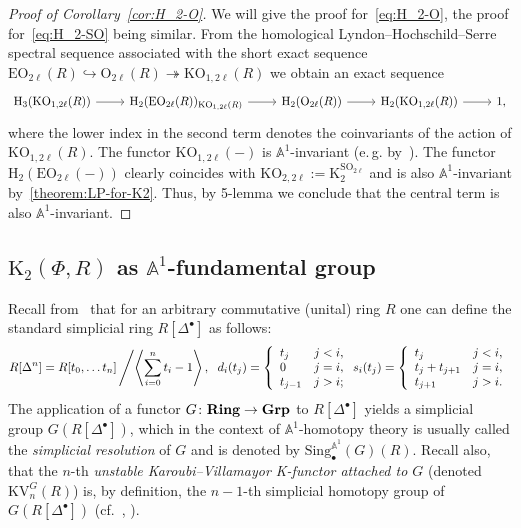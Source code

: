 \documentclass[oneside, 11pt]{amsart}
\numberwithin{equation}{section}
\newcommand{\K}{{\mathrm{K}}}
\theoremstyle{definition}
\theoremstyle{definition}
\theoremstyle{remark}
\newcommand{\catname}[1]{{\normalfont\textbf{#1}}} %
\begin{document}
 \begin{proof}[Proof of Corollary~\ref{cor:H_2-O}]
  We will give the proof for~\eqref{eq:H_2-O}, the proof for~\eqref{eq:H_2-SO} being similar.
  From the homological Lyndon--Hochschild--Serre spectral sequence associated with the short exact sequence $\mathrm{EO}_{2\ell}(R) \hookrightarrow \mathrm{O}_{2\ell}(R) \twoheadrightarrow \mathrm{KO}_{1, 2\ell}(R)$ we obtain an exact sequence
  \[ \begin{tikzcd} \mathrm H_3(\mathrm{KO}_{1,2\ell}(R)) \ar[r] & \mathrm H_2(\mathrm{EO}_{2\ell}(R))_{\mathrm{KO}_{1,2\ell}(R)} \ar[r] & \mathrm H_2(\mathrm{O}_{2\ell}(R)) \ar[r] &  \mathrm H_2(\mathrm{KO}_{1, 2\ell}(R)) \ar[r] & 1, \end{tikzcd} \]
  where the lower index in the second term denotes the coinvariants of the action of $\mathrm{KO}_{1,2\ell}(R)$.
  The functor $\mathrm{KO}_{1, 2\ell}(-)$ is $\mathbb{A}^1$-invariant (e.\,g. by~\cite[Theorem~1.1]{Sta20}).
  The functor $\mathrm H_2(\mathrm{EO}_{2\ell}(-))$ clearly coincides with $\mathrm{KO}_{2, 2\ell} := \K_2^{\mathrm {SO}_{2\ell}}$ and is also $\mathbb{A}^1$-invariant by~\cref{theorem:LP-for-K2}. Thus, by 5-lemma we conclude that the central term is also $\mathbb{A}^1$-invariant.
 \end{proof}
 
 
 
 
 
 
 
 
 
 
 
\subsection{\texorpdfstring{$\K_2(\Phi, R)$}{K2(R)} as $\mathbb{A}^1$-fundamental group} \label{sec:K2-as-pi-1}
Recall from~\cite{Jar83} that for an arbitrary commutative (unital) ring $R$ one can define the standard simplicial ring $R[\Delta^\bullet]$ as follows:
\begin{equation}
 R[\Delta^n] = R[t_0,\ldots t_n]\left/\left\langle \sum_{i=0}^n t_i -1 \right\rangle,\right.\ d_i(t_j) = \left\{ \begin{array}{ll}t_j & j < i, \\0 & j = i, \\ t_{j-1} & j > i; \end{array}\right. s_i(t_j) = \left\{ \begin{array}{ll} t_j & j < i, \\ t_j + t_{j+1} & j = i, \\ t_{j+1} & j > i. \end{array} \right.
\end{equation}
	The application of a functor $G\colon\catname{Ring}\rightarrow\catname{Grp}$ to $R[\Delta^\bullet]$ yields a simplicial group $G(R[\Delta^\bullet])$, which in the context of $\mathbb{A}^1$-homotopy theory is usually called the {\it simplicial resolution} of $G$ and is denoted by $\mathrm{Sing}^{\mathbb{A}^1}_\bullet(G)(R)$. Recall also, that the $n$-th {\it unstable Karoubi--Villamayor K-functor attached to $G$} (denoted $\mathrm{KV}^G_n(R)$) is, by definition, the $n-1$-th simplicial homotopy group of $G(R[\Delta^\bullet])$ (cf.~\cite[\S~4.3]{AHW18}, \cite[\S~3]{Jar83}).
\end{document}
